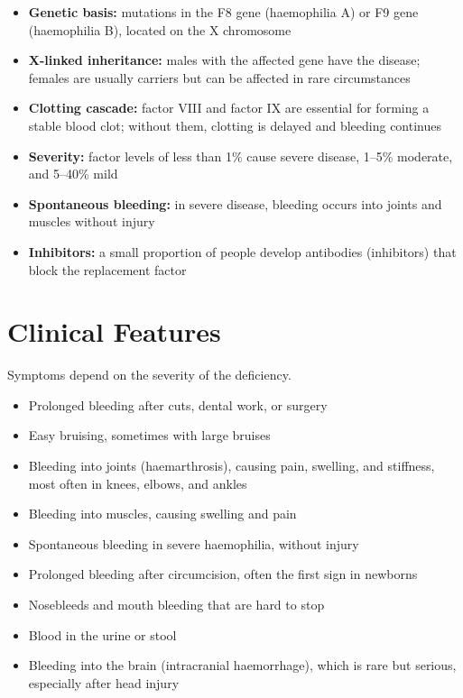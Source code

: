 \begin{itemize}
    \item \textbf{Genetic basis:} mutations in the F8 gene (haemophilia A) or F9 gene (haemophilia B), located on the X chromosome
    \item \textbf{X-linked inheritance:} males with the affected gene have the disease; females are usually carriers but can be affected in rare circumstances
    \item \textbf{Clotting cascade:} factor VIII and factor IX are essential for forming a stable blood clot; without them, clotting is delayed and bleeding continues
    \item \textbf{Severity:} factor levels of less than 1\% cause severe disease, 1--5\% moderate, and 5--40\% mild
    \item \textbf{Spontaneous bleeding:} in severe disease, bleeding occurs into joints and muscles without injury
    \item \textbf{Inhibitors:} a small proportion of people develop antibodies (inhibitors) that block the replacement factor
\end{itemize}

\section*{Clinical Features}
Symptoms depend on the severity of the deficiency.

\begin{itemize}
    \item Prolonged bleeding after cuts, dental work, or surgery
    \item Easy bruising, sometimes with large bruises
    \item Bleeding into joints (haemarthrosis), causing pain, swelling, and stiffness, most often in knees, elbows, and ankles
    \item Bleeding into muscles, causing swelling and pain
    \item Spontaneous bleeding in severe haemophilia, without injury
    \item Prolonged bleeding after circumcision, often the first sign in newborns
    \item Nosebleeds and mouth bleeding that are hard to stop
    \item Blood in the urine or stool
    \item Bleeding into the brain (intracranial haemorrhage), which is rare but serious, especially after head injury
\end{itemize}

